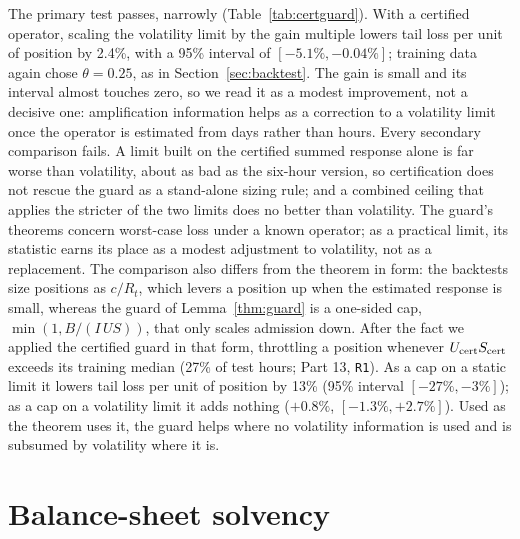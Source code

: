 \documentclass[12pt]{article}
\theoremstyle{definition}
\theoremstyle{remark}
\begin{document}
The primary test passes, narrowly (Table~\ref{tab:certguard}). With a certified operator, scaling the volatility limit by the gain multiple lowers tail loss per unit of position by 2.4\%, with a 95\% interval of $[-5.1\%,-0.04\%]$; training data again chose $\theta=0.25$, as in Section~\ref{sec:backtest}. The gain is small and its interval almost touches zero, so we read it as a modest improvement, not a decisive one: amplification information helps as a correction to a volatility limit once the operator is estimated from days rather than hours. Every secondary comparison fails. A limit built on the certified summed response alone is far worse than volatility, about as bad as the six-hour version, so certification does not rescue the guard as a stand-alone sizing rule; and a combined ceiling that applies the stricter of the two limits does no better than volatility. The guard's theorems concern worst-case loss under a known operator; as a practical limit, its statistic earns its place as a modest adjustment to volatility, not as a replacement. The comparison also differs from the theorem in form: the backtests size positions as $c/R_t$, which levers a position up when the estimated response is small, whereas the guard of Lemma~\ref{thm:guard} is a one-sided cap, $\min(1,B/(I\,U S))$, that only scales admission down. After the fact we applied the certified guard in that form, throttling a position whenever $U_{\rm cert}S_{\rm cert}$ exceeds its training median (27\% of test hours; Part 13, \texttt{R1}). As a cap on a static limit it lowers tail loss per unit of position by 13\% (95\% interval $[-27\%,-3\%]$); as a cap on a volatility limit it adds nothing ($+0.8\%$, $[-1.3\%,+2.7\%]$). Used as the theorem uses it, the guard helps where no volatility information is used and is subsumed by volatility where it is.

\section{Balance-sheet solvency}
\end{document}
